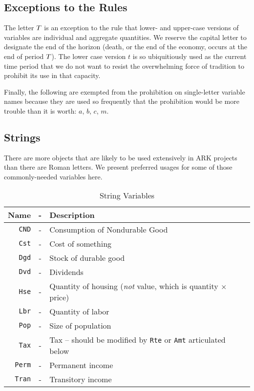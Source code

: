 \documentclass[12pt]{econtex}
\begin{document}
\subsection{Exceptions to the Rules}

The letter $T$ is an exception to the rule that lower- and upper-case versions of variables are individual and aggregate quantities.  We reserve the capital letter to designate the end of the horizon (death, or the end of the economy, occurs at the end of period $T$).  The lower case version $t$ is so ubiquitiously used as the current time period that we do not want to resist the overwhelming force of tradition to prohibit its use in that capacity.

Finally, the following are exempted from the prohibition on single-letter variable names because they are used so frequently that the prohibition would be more trouble than it is worth: $a$, $b$, $c$, $m$.  


\pagebreak

\subsection{Strings}

There are more objects that are likely to be used extensively in ARK projects than there are Roman letters.  We present preferred usages for some of those commonly-needed variables here.

\begin{table}[h]
\begin{center}
\begin{tabular}{|rcl|}
\hline
Name & - & Description 
 \\ \hline
     \texttt{CND}    & - & Consumption of Nondurable Good 
 \\  \texttt{Cst}    & - & Cost of something 
 \\  \texttt{Dgd}    & - & Stock of durable good
 \\  \texttt{Dvd}    & - & Dividends 
 \\  \texttt{Hse}    & - & Quantity of housing ({\it not} value, which is quantity $\times$ price)
 \\  \texttt{Lbr}    & - & Quantity of labor
 \\  \texttt{Pop}    & - & Size of population
 \\  \texttt{Tax} & - & Tax -- should be modified by \texttt{Rte} or \texttt{Amt} articulated below
 \\  \texttt{Perm}   & - & Permanent income
 \\  \texttt{Tran}   & - & Transitory income
\\ \hline
\end{tabular}
\caption{String Variables}
\label{table:Strings}
\end{center}
\end{table}
\end{document}

